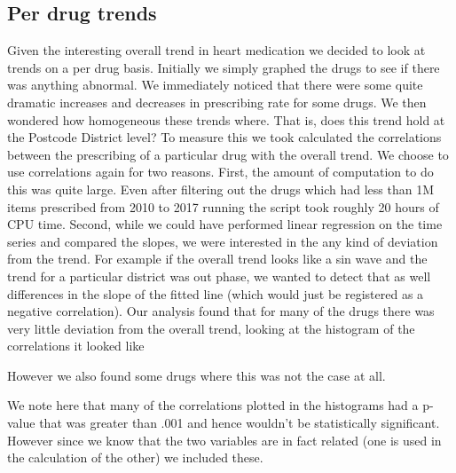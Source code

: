 \documentclass[a4paper]{article}
\begin{document}
	\subsection{Per drug trends}
		Given the interesting overall trend in heart medication we decided to look at 
		trends on a per drug basis. Initially we simply graphed the drugs to see if there 
		was anything abnormal. We immediately noticed that there were some quite dramatic 
		increases and decreases in prescribing rate for some drugs. We then wondered how 
		homogeneous these trends where. That is, does this trend hold at the Postcode District 
		level? To measure this we took calculated the correlations between the prescribing of a 
		particular drug with the overall trend. We choose to use correlations again for two 
		reasons. First, the amount of computation to do this was quite large. Even after filtering
		out the drugs which had less than 1M items prescribed from 2010 to 2017 running the script 
		took roughly 20 hours of CPU time. Second, while we could have performed linear regression on 
		the time series and compared the slopes, we were interested in the any kind of deviation from the 
		trend. For example if the overall trend looks like a sin wave and the trend for a 
		particular district was out phase, we wanted to detect that as well differences in 
		the slope of the fitted line (which would just be registered as a negative correlation). 
		Our analysis found that for many of the drugs there was very little deviation from the overall 
		trend, looking at the histogram of the correlations it looked like %

		However we also found some drugs where this was not the case at all. %


		
		We note here that many of the correlations plotted in the histograms had a p-value that was greater
		than .001 and hence wouldn't be statistically significant. However since we know that the two 
		variables are in fact related (one is used in the calculation of the other) we included these.
\end{document}

